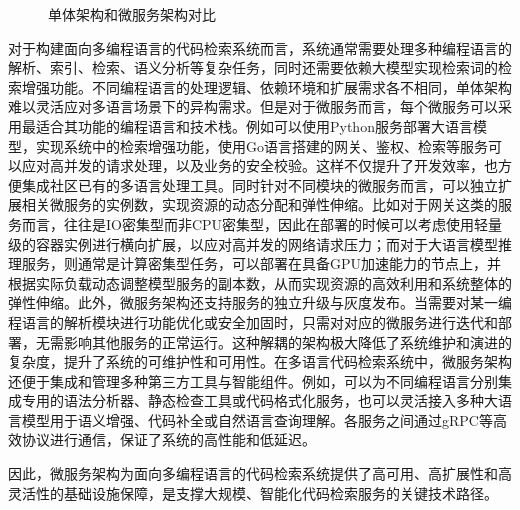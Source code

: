 \documentclass[UTF8,a4paper,12pt]{ctexart}
\numberwithin{equation}{section}
\begin{document}
\begin{figure}[H]
	\caption{单体架构和微服务架构对比}
	\label{compare}
\end{figure}
对于构建面向多编程语言的代码检索系统而言，系统通常需要处理多种编程语言的解析、索引、检索、语义分析等复杂任务，同时还需要依赖大模型实现检索词的检索增强功能。不同编程语言的处理逻辑、依赖环境和扩展需求各不相同，单体架构难以灵活应对多语言场景下的异构需求。但是对于微服务而言，每个微服务可以采用最适合其功能的编程语言和技术栈。例如可以使用Python服务部署大语言模型，实现系统中的检索增强功能，使用Go语言搭建的网关、鉴权、检索等服务可以应对高并发的请求处理，以及业务的安全校验。这样不仅提升了开发效率，也方便集成社区已有的多语言处理工具。同时针对不同模块的微服务而言，可以独立扩展相关微服务的实例数，实现资源的动态分配和弹性伸缩。比如对于网关这类的服务而言，往往是IO密集型而非CPU密集型，因此在部署的时候可以考虑使用轻量级的容器实例进行横向扩展，以应对高并发的网络请求压力；而对于大语言模型推理服务，则通常是计算密集型任务，可以部署在具备GPU加速能力的节点上，并根据实际负载动态调整模型服务的副本数，从而实现资源的高效利用和系统整体的弹性伸缩。此外，微服务架构还支持服务的独立升级与灰度发布。当需要对某一编程语言的解析模块进行功能优化或安全加固时，只需对对应的微服务进行迭代和部署，无需影响其他服务的正常运行。这种解耦的架构极大降低了系统维护和演进的复杂度，提升了系统的可维护性和可用性。在多语言代码检索系统中，微服务架构还便于集成和管理多种第三方工具与智能组件。例如，可以为不同编程语言分别集成专用的语法分析器、静态检查工具或代码格式化服务，也可以灵活接入多种大语言模型用于语义增强、代码补全或自然语言查询理解。各服务之间通过gRPC等高效协议进行通信，保证了系统的高性能和低延迟。\par
因此，微服务架构为面向多编程语言的代码检索系统提供了高可用、高扩展性和高灵活性的基础设施保障，是支撑大规模、智能化代码检索服务的关键技术路径。\par
\end{document}
